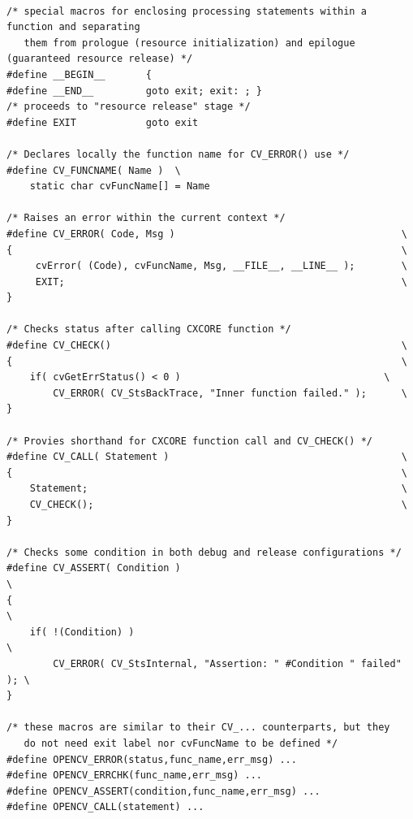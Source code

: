 \begin{lstlisting}

/* special macros for enclosing processing statements within a function and separating
   them from prologue (resource initialization) and epilogue (guaranteed resource release) */
#define __BEGIN__       {
#define __END__         goto exit; exit: ; }
/* proceeds to "resource release" stage */
#define EXIT            goto exit

/* Declares locally the function name for CV_ERROR() use */
#define CV_FUNCNAME( Name )  \
    static char cvFuncName[] = Name

/* Raises an error within the current context */
#define CV_ERROR( Code, Msg )                                       \
{                                                                   \
     cvError( (Code), cvFuncName, Msg, __FILE__, __LINE__ );        \
     EXIT;                                                          \
}

/* Checks status after calling CXCORE function */
#define CV_CHECK()                                                  \
{                                                                   \
    if( cvGetErrStatus() < 0 )                                   \
        CV_ERROR( CV_StsBackTrace, "Inner function failed." );      \
}

/* Provies shorthand for CXCORE function call and CV_CHECK() */
#define CV_CALL( Statement )                                        \
{                                                                   \
    Statement;                                                      \
    CV_CHECK();                                                     \
}

/* Checks some condition in both debug and release configurations */
#define CV_ASSERT( Condition )                                          \
{                                                                       \
    if( !(Condition) )                                                  \
        CV_ERROR( CV_StsInternal, "Assertion: " #Condition " failed" ); \
}

/* these macros are similar to their CV_... counterparts, but they
   do not need exit label nor cvFuncName to be defined */
#define OPENCV_ERROR(status,func_name,err_msg) ...
#define OPENCV_ERRCHK(func_name,err_msg) ...
#define OPENCV_ASSERT(condition,func_name,err_msg) ...
#define OPENCV_CALL(statement) ...

\end{lstlisting}


